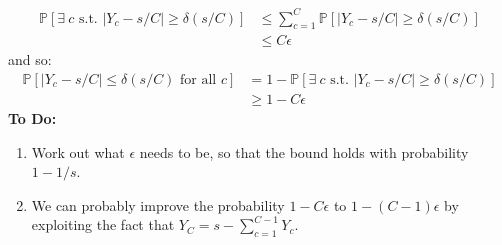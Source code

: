 \documentclass{article}
\begin{document}
\begin{align}
\mathbb{P}\left[ \exists \ c \text{ s.t. } \left| Y_{c} - s/C\right| \geq \delta(s/C)\right] & \leq \sum_{c=1}^{C}\mathbb{P}\left[ \left| Y_{c} - s/C\right| \geq \delta(s/C) \right] \\
	& \leq C\epsilon
\label{eq:Exists_forAll}
\end{align}
and so:
\begin{align*}
\mathbb{P}\left[ |Y_{c} - s/C| \leq \delta(s/C) \text{ for all } c\right] & = 1 - \mathbb{P}\left[ \exists \ c \text{ s.t. } \left| Y_{c} - s/C\right| \geq \delta(s/C)\right] \\
	& \geq 1 - C\epsilon
\end{align*}
{\bf To Do:}
\begin{enumerate}
	\item Work out what $\epsilon$ needs to be, so that the bound holds with probability $1 - 1/s$. \\
	\item We can probably improve the probability $1 - C\epsilon$ to $1 - (C-1)\epsilon$ by exploiting the fact that $Y_{C} = s - \sum_{c=1}^{C-1}Y_{c}$. 
\end{enumerate}
\end{document}
